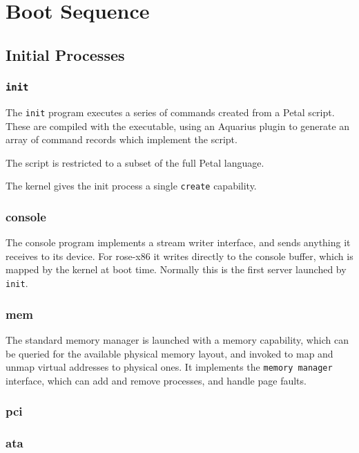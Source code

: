 \chapter{Boot Sequence}

\section{Initial Processes}

\subsection{{\tt init}}

The {\tt init} program executes a series of commands created from a Petal script.  These are compiled with the executable, using an Aquarius plugin to generate an array of command records which implement the script.

The script is restricted to a subset of the full Petal language.

The kernel gives the init process a single {\tt create} capability.

\subsection{console}

The console program implements a stream writer interface, and sends anything it receives to its device.  For rose-x86 it writes directly to the console buffer, which is mapped by the kernel at boot time.  Normally this is the first server launched by {\tt init}.

\subsection{mem}

The standard memory manager is launched with a memory capability, which can be queried for the available physical memory layout, and invoked to map and unmap virtual addresses to physical ones.  It implements the {\tt memory manager} interface, which can add and remove processes, and handle page faults.

\subsection{pci}

\subsection{ata}

